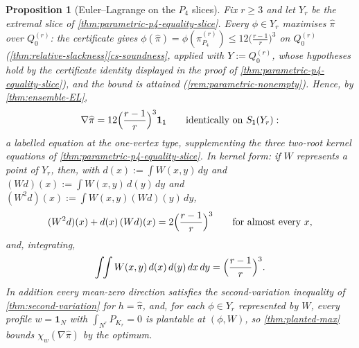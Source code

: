 \documentclass[11pt]{article}
\newtheorem{proposition}[proposition]{Proposition}
\theoremstyle{definition}
\newcommand{\one}{\mathbf 1}
\newcommand{\vtype}{\mathsf{1}}
\begin{document}
\begin{proposition}[Euler--Lagrange on the $P_4$ slices]\label{prop:p4-el}
Fix $r\ge3$ and let $Y_r$ be the extremal slice of
\cref{thm:parametric-p4-equality-slice}.  Every $\phi\in Y_r$ maximises
$\widehat\pi$ over $Q_0^{(r)}$: the certificate gives
$\phi(\widehat\pi)=\phi(\pi_{P_4}^{(r)})\le12\bigl(\tfrac{r-1}r\bigr)^3$ on
$Q_0^{(r)}$
\textup(\cref{thm:relative-slackness}\ref{cs-soundness}, applied with
$Y:=Q_0^{(r)}$, whose hypotheses hold by the certificate identity displayed in the
proof of \cref{thm:parametric-p4-equality-slice}\textup), and the bound is
attained \textup(\cref{rem:parametric-nonempty}\textup).  Hence, by
\cref{thm:ensemble-EL},
\[
  \nabla\widehat\pi
  =12\Bigl(\frac{r-1}{r}\Bigr)^3\one_{\vtype}
  \qquad\text{identically on }S_{\vtype}(Y_r):
\]
a labelled equation at the one-vertex type, supplementing the three two-root kernel
equations of \cref{thm:parametric-p4-equality-slice}.  In kernel form: if $W$
represents a point of $Y_r$, then, with $d(x):=\int W(x,y)\,dy$ and
$(Wd)(x):=\int W(x,y)\,d(y)\,dy$ and $(W^2d)(x):=\int W(x,y)(Wd)(y)\,dy$,
\begin{equation}\label{eq:p4-el-kernel}
  (W^2d)(x)+d(x)\,(Wd)(x)=2\Bigl(\frac{r-1}{r}\Bigr)^3
  \qquad\text{for almost every }x ,
\end{equation}
and, integrating,
\begin{equation}\label{eq:p4-el-moment}
  \int\!\!\int W(x,y)\,d(x)\,d(y)\,dx\,dy=\Bigl(\frac{r-1}{r}\Bigr)^3 .
\end{equation}
In addition every mean-zero direction satisfies the second-variation inequality of
\cref{thm:second-variation} for $h=\widehat\pi$, and, for each $\phi\in Y_r$
represented by $W$, every profile $w=\one_N$ with
$\int_{N^r}P_{K_r}=0$ is plantable at $(\phi,W)$, so \cref{thm:planted-max} bounds
$\chi_w(\nabla\widehat\pi)$ by the optimum.
\end{proposition}
\end{document}
